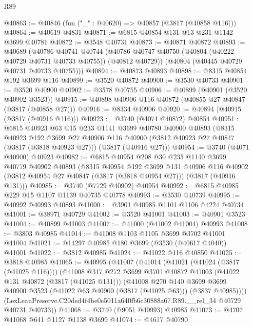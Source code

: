 \begin{lexlean}{R89}
\begin{coremodule}
@40863 := @40846 (fun ("_" : @40620) => @40857 (@3817 (@40858 @116)))
@40864 := @40619 @4831
@40871 := @6815 @40854 @131 @13 @231 @1142 @3699 @40781
@40872 := @3548 @40731
@40873 := @40871 @40872
@40893 := @40689
    (@40786
      @40741
      @40744
      (@40786 @40747 @40750 (@40804 (@40222 @40729 @40731 @40733 @40755)) (@40812 @40729))
      (@40804 (@40445 @40729 @40731 @40733 @40755)))
@40894 := @40873 @40893
@40898 := @8315 @40854 @192 @3699 @116
@40899 := @3520 @40872
@40900 := @3530 @40733
@40901 := @3520 @40900
@40902 := @3578 @40755
@40906 := @40899 (@40901 (@3520 @40902 @3523))
@40915 := @40898 @40906 @116 @40872 (@40855 @27 @40847 (@3817 (@40858 @27)))
@40916 := @8334 @40906
@40920 := @40894 (@40915 (@3817 (@40916 @116)))
@40923 := @3740 (@4074 @40872) @40854
@40951 := @6815
    @40923
    @63
    @15
    @233
    @1141
    @3699
    @40780
    @40900
    @40893
    (@8315
      @40923
      @192
      @3699
      @27
      @40906
      @116
      @40900
      (@3812 @40923 @27 @40847 (@3817 (@3818 @40923 @27)))
      (@3817 (@40916 @27)))
@40954 := @3740 (@4071 @40900) @40923
@40982 := @6815
    @40954
    @208
    @30
    @235
    @1140
    @3699
    @40779
    @40902
    @40893
    (@8315
      @40954
      @192
      @3699
      @131
      @40906
      @116
      @40902
      (@3812 @40954 @27 @40847 (@3817 (@3818 @40954 @27)))
      (@3817 (@40916 @131)))
@40985 := @3740 (@7729 @40902) @40954
@40992 := @6815 @40985 @229 @15 @1107 @1139 @40735 @40778
@40993 := @3530 @40739
@40995 := @40992 @40993 @40893
@41000 := @3901 @40985 @1101 @1106 @4224 @40734
@41001 := @38971 @40729
@41002 := @3520 @41001
@41003 := @40901 @3523
@41004 := @40899 @41003
@41007 := @41000 (@41002 @41004) @40993
@41008 := @3803 @40985
@41014 := @41008 @1103 @1105 @3699 @3702 @41001 @41004
@41021 := @14297 @40985 @180 @3699 (@3530 (@40617 @4040)) @41001
@41022 := @3812 @40985
@41024 := @41022 @116 @40850
@41025 := @3818 @40985
@41065 := @40995
    (@41007
      (@41014
        (@41021 (@41024 (@3817 (@41025 @116))))
        (@41008
          @317
          @272
          @3699
          @3701
          @40872
          @41003
          (@41022 @131 @40872 (@3817 (@41025 @131)))
          (@41008
            @270
            @140
            @3699
            @3699
            @40900
            @3523
            (@41022 @63 @40900 (@3817 (@41025 @63)))
            (@3837 @40985))))
      (LexLeanPreserve.C20ded4f4be0e5011a640fb6c30888a67.R89.__rel_34 @40729 @40731 @40733))
@41068 := @3740 (@9051 @40993) @40985
@41073 := @4707 @41068 @641 @1127 @1138 @3699
@41074 := @4617 @40790

\end{coremodule}
\end{lexlean}
